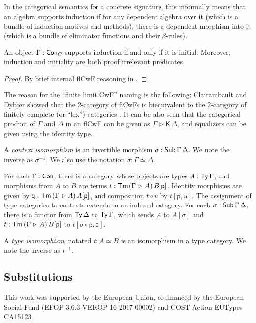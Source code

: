 \documentclass[sigplan,review,anonymous]{acmart}\settopmatter{printfolios=true,printccs=false,printacmref=false}
\newcommand{\ext}{\triangleright}
\newcommand{\Kfam}{\mathsf{K}}
\newcommand{\p}{\mathsf{p}}
\newcommand{\q}{\mathsf{q}}
\begin{document}
In the categorical semantics for a concrete signature, this informally means
that an algebra supports induction if for any dependent algebra over it (which
is a bundle of induction motives and methods), there is a dependent morphism
into it (which is a bundle of eliminator functions and their $\beta$-rules).

\begin{theorem}
An object $\Gamma : \mathsf{Con}_C$ supports induction if and only if it is
initial. Moreover, induction and initiality are both proof irrelevant
predicates.
\end{theorem}
\begin{proof} By brief internal flCwF reasoning in \cite{kaposi2019constructing}.
\end{proof}

The reason for the ``finite limit CwF'' naming is the following: Clairambault
and Dybjer showed that the 2-category of flCwFs is biequivalent to the
2-category of finitely complete (or ``lex'') categories
\cite{clairambault2014biequivalence}. It can be also seen that the categorical
product of $\Gamma$ and $\Delta$ in an flCwF can be given as $\Gamma \ext
\Kfam\, \Delta$, and equalizers can be given using the identity type.


\begin{definition} A \emph{context isomorphism} is an invertible morphism $\sigma : \mathsf{Sub}\,\Gamma\,\Delta$. We note the inverse as $\sigma^{-1}$. We also use the notation $\sigma : \Gamma \simeq \Delta$.
\end{definition}

\begin{definition} For each $\Gamma : \mathsf{Con}$, there is a category
whose objects are types $A : \mathsf{Ty}\,\Gamma$, and morphisms from $A$ to $B$ are
terms $t : \Tm\,(\Gamma\,\ext\,A)\,B[\p]$. Identity morphisms are given by $\q :
\Tm\,(\Gamma\,\ext\,A)\,A[\p]$, and composition $t \circ u$ by $t[\p, u]$. The
assignment of type categories to contexts extends to an indexed category. For
each $\sigma : \mathsf{Sub}\,\Gamma\,\Delta$, there is a functor from $\mathsf{Ty}\,\Delta$ to
$\mathsf{Ty}\,\Gamma$, which sends $A$ to $A[\sigma]$ and $t :
\Tm\,(\Gamma\,\ext\,A)\,B[\p]$ to $t[\sigma\circ \p, \q]$.
\end{definition}

\begin{definition} A \emph{type isomorphism}, notated $t : A \simeq B$ is an isomorphism in a type category. We note the inverse as $t^{-1}$.
\end{definition}

\subsection{Substitutions}







\begin{acks}
This work was supported by the European Union, co-financed by the
European Social Fund (EFOP-3.6.3-VEKOP-16-2017-00002) and COST Action
EUTypes CA15123.
\end{acks}



\end{document}
